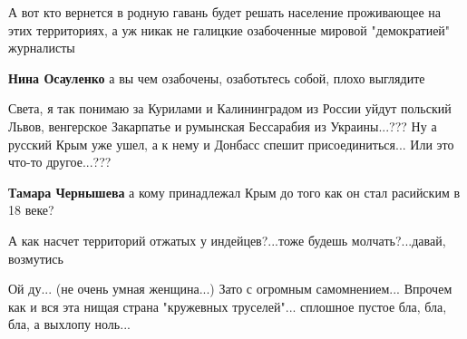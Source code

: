 \begin{itemize}
А вот кто вернется в родную гавань будет решать население проживающее на этих территориях, а уж никак не галицкие озабоченные мировой "демократией" журналисты

\begin{itemize}
 
\textbf{Нина Осауленко} а вы чем озабочены, озаботьтесь собой, плохо выглядите
\end{itemize}

 

Света, я так понимаю за Курилами и Калининградом из России уйдут польский
Львов, венгерское Закарпатье и румынская Бессарабия из Украины...??? Ну а
русский Крым уже ушел, а к нему и Донбасс спешит присоединиться... Или это
что-то другое...???

\begin{itemize}
 
\textbf{Тамара Чернышева} а кому принадлежал Крым до того как он стал расийским в 18 веке?
\end{itemize}

 
А как насчет территорий отжатых у индейцев?...тоже будешь молчать?...давай, возмутись

 
Ой ду... (не очень умная женщина...) Зато с огромным самомнением... Впрочем как и вся эта нищая страна "кружевных труселей"... сплошное пустое бла, бла, бла, а выхлопу ноль...


\end{itemize}
